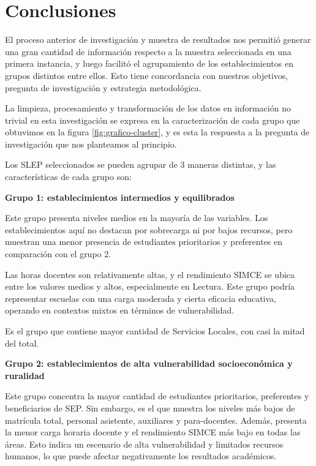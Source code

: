 \documentclass[
  12pt,
  letterpaper,
]{article}
\begin{document}
\newpage

\section{Conclusiones}\label{conclusiones}

El proceso anterior de investigación y muestra de resultados nos permitió generar una gran cantidad de información respecto a la muestra seleccionada en una primera instancia, y luego facilitó el agrupamiento de los establecimientos en grupos distintos entre ellos.
Esto tiene concordancia con nuestros objetivos, pregunta de investigación y estrategia metodológica.

La limpieza, procesamiento y transformación de los datos en información no trivial en esta investigación se expresa en la caracterización de cada grupo que obtuvimos en la figura \ref{fig:grafico-cluster}, y es esta la respuesta a la pregunta de investigación que nos planteamos al principio.

Los SLEP seleccionados se pueden agrupar de 3 maneras distintas, y las características de cada grupo son:

\textbf{Grupo 1: establecimientos intermedios y equilibrados}

Este grupo presenta niveles medios en la mayoría de las variables.
Los establecimientos aquí no destacan por sobrecarga ni por bajos recursos, pero muestran una menor presencia de estudiantes prioritarios y preferentes en comparación con el grupo 2.

Las horas docentes son relativamente altas, y el rendimiento SIMCE se ubica entre los valores medios y altos, especialmente en Lectura.
Este grupo podría representar escuelas con una carga moderada y cierta eficacia educativa, operando en contextos mixtos en términos de vulnerabilidad.

Es el grupo que contiene mayor cantidad de Servicios Locales, con casi la mitad del total.

\textbf{Grupo 2: establecimientos de alta vulnerabilidad socioeconómica y ruralidad}

Este grupo concentra la mayor cantidad de estudiantes prioritarios, preferentes y beneficiarios de SEP.
Sin embargo, es el que muestra los niveles más bajos de matrícula total, personal asistente, auxiliares y para-docentes.
Además, presenta la menor carga horaria docente y el rendimiento SIMCE más bajo en todas las áreas.
Esto indica un escenario de alta vulnerabilidad y limitados recursos humanos, lo que puede afectar negativamente los resultados académicos.
\end{document}
